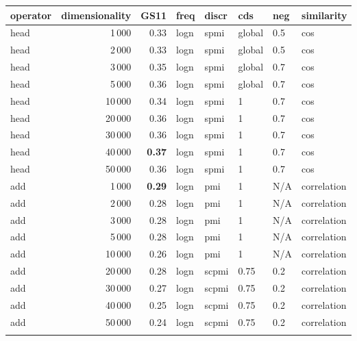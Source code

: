 \begin{tabular}{lrrlllll}
\toprule
operator &  dimensionality &  GS11 &  freq &  discr &     cds &  neg &     similarity \\
\midrule
    head &            1\,000 &  0.33 &  logn &   spmi &  global &  0.5 &            cos \\
    head &            2\,000 &  0.33 &  logn &   spmi &  global &  0.5 &            cos \\
    head &            3\,000 &  0.35 &  logn &   spmi &  global &  0.7 &            cos \\
    head &            5\,000 &  0.36 &  logn &   spmi &  global &  0.7 &            cos \\
    head &           10\,000 &  0.34 &  logn &   spmi &       1 &  0.7 &            cos \\
    head &           20\,000 &  0.36 &  logn &   spmi &       1 &  0.7 &            cos \\
    head &           30\,000 &  0.36 &  logn &   spmi &       1 &  0.7 &            cos \\
    head &           40\,000 &  \textbf{0.37} &  logn &   spmi &       1 &  0.7 &            cos \\
    head &           50\,000 &  0.36 &  logn &   spmi &       1 &  0.7 &            cos \\ \addlinespace
     add &            1\,000 &  \textbf{0.29} &  logn &    pmi &       1 &  N/A &    correlation \\
     add &            2\,000 &  0.28 &  logn &    pmi &       1 &  N/A &    correlation \\
     add &            3\,000 &  0.28 &  logn &    pmi &       1 &  N/A &    correlation \\
     add &            5\,000 &  0.28 &  logn &    pmi &       1 &  N/A &    correlation \\
     add &           10\,000 &  0.26 &  logn &    pmi &       1 &  N/A &    correlation \\
     add &           20\,000 &  0.28 &  logn &  scpmi &    0.75 &  0.2 &    correlation \\
     add &           30\,000 &  0.27 &  logn &  scpmi &    0.75 &  0.2 &    correlation \\
     add &           40\,000 &  0.25 &  logn &  scpmi &    0.75 &  0.2 &    correlation \\
     add &           50\,000 &  0.24 &  logn &  scpmi &    0.75 &  0.2 &    correlation \\ \addlinespace

\end{tabular}
